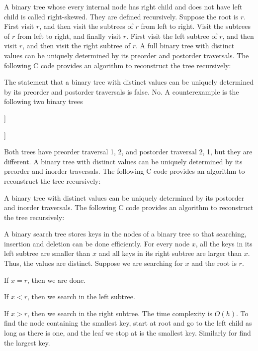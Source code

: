 \documentclass[a4paper,12pt]{article}
\begin{document}
A binary tree whose every internal node has right child and does not have left child is called right-skewed.
They are defined recursively. Suppose the root is $r$.
First visit $r$, and then visit the subtrees of $r$ from left to right.
Visit the subtrees of $r$ from left to right, and finally visit $r$.
First visit the left subtree of $r$, and then visit $r$, and then visit the right subtree of $r$.
A full binary tree with distinct values can be uniquely determined by its preorder and postorder traversals.
\bpr
The following C code provides an algorithm to reconstruct the tree recursively:

\epr
{}
The statement that a binary tree with distinct values can be uniquely determined by its preorder and postorder traversals is false.
\bpr
No. A counterexample is the following two binary trees
\begin{center}
	\begin{forest}
		[1[2][,phantom]]
	\end{forest}
	\begin{forest}
		[1[,phantom][2]]
	\end{forest}
\end{center}
Both trees have preorder traversal 1, 2, and postorder traversal 2, 1, but they are different.
\epr
{}
A binary tree with distinct values can be uniquely determined by its preorder and inorder traversals.
\bpr
The following C code provides an algorithm to reconstruct the tree recursively:

\epr
{}
A binary tree with distinct values can be uniquely determined by its postorder and inorder traversals.
\bpr
The following C code provides an algorithm to reconstruct the tree recursively:

\epr
{}
A binary search tree stores keys in the nodes of a binary tree so that searching, insertion and deletion can be done efficiently. For every node $x$, all the keys in its left subtree are smaller than $x$ and all keys in its right subtree are larger than $x$. Thus, the values are distinct.
Suppose we are searching for $x$ and the root is $r$.
\bit
\item If $x=r$, then we are done.
\item If $x<r$, then we search in the left subtree.
\item If $x>r$, then we search in the right subtree.
\eit
The time complexity is $O(h)$.
To find the node containing the smallest key, start at root and go to the left child as long as there is one, and the leaf we stop at is the smallest key. Similarly for find the largest key.
\end{document}
